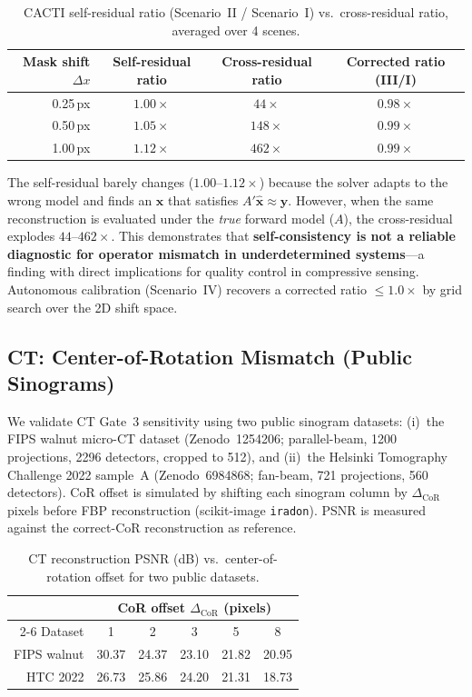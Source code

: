 \documentclass[11pt]{article}
\theoremstyle{definition}
\begin{document}
\begin{table}[!ht]
\centering\small
\caption{CACTI self-residual ratio (Scenario~II / Scenario~I) vs.\ cross-residual ratio, averaged over 4 scenes.}
\label{tab:cacti_cross_res}
\begin{tabular}{@{}rccc@{}}
\toprule
Mask shift $\Delta x$ & Self-residual ratio & Cross-residual ratio & Corrected ratio (III/I) \\
\midrule
0.25\,px & $1.00\times$ & $44\times$  & $0.98\times$ \\
0.50\,px & $1.05\times$ & $148\times$ & $0.99\times$ \\
1.00\,px & $1.12\times$ & $462\times$ & $0.99\times$ \\
\bottomrule
\end{tabular}
\end{table}

\noindent The self-residual barely changes ($1.00$--$1.12\times$) because the solver adapts to the wrong model and finds an $\mathbf{x}$ that satisfies $A'\hat{\mathbf{x}} \approx \mathbf{y}$.
However, when the same reconstruction is evaluated under the \emph{true} forward model ($A$), the cross-residual explodes $44$--$462\times$.
This demonstrates that \textbf{self-consistency is not a reliable diagnostic for operator mismatch in underdetermined systems}---a finding with direct implications for quality control in compressive sensing.
Autonomous calibration (Scenario~IV) recovers a corrected ratio $\leq 1.0\times$ by grid search over the 2D shift space.

\subsection{CT: Center-of-Rotation Mismatch (Public Sinograms)}
\label{sec:ct_cor}

We validate CT Gate~3 sensitivity using two public sinogram datasets:
(i)~the FIPS walnut micro-CT dataset (Zenodo~1254206; parallel-beam, 1200 projections, 2296 detectors, cropped to 512), and
(ii)~the Helsinki Tomography Challenge 2022 sample~A (Zenodo~6984868; fan-beam, 721 projections, 560 detectors).
CoR offset is simulated by shifting each sinogram column by $\Delta_{\mathrm{CoR}}$ pixels before FBP reconstruction (scikit-image \texttt{iradon}).
PSNR is measured against the correct-CoR reconstruction as reference.

\begin{table}[!ht]
\centering\small
\caption{CT reconstruction PSNR (dB) vs.\ center-of-rotation offset for two public datasets.}
\label{tab:ct_cor}
\begin{tabular}{@{}rccccc@{}}
\toprule
& \multicolumn{5}{c}{CoR offset $\Delta_{\mathrm{CoR}}$ (pixels)} \\
\cmidrule(l){2-6}
Dataset & 1 & 2 & 3 & 5 & 8 \\
\midrule
FIPS walnut    & 30.37 & 24.37 & 23.10 & 21.82 & 20.95 \\
HTC 2022       & 26.73 & 25.86 & 24.20 & 21.31 & 18.73 \\
\bottomrule
\end{tabular}
\end{table}
\end{document}
